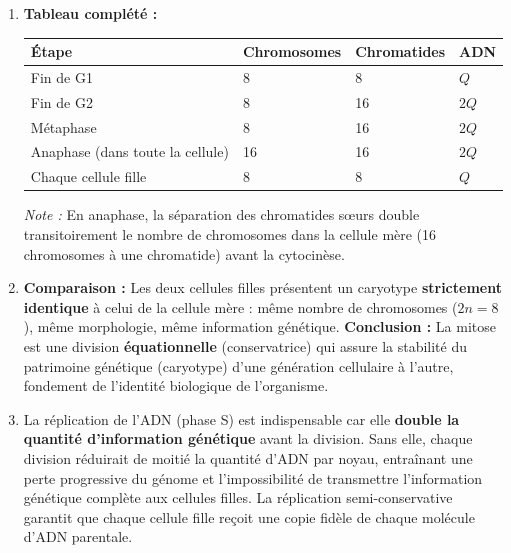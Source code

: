 \documentclass[11pt]{article}
\begin{document}
\begin{corrige}[Exercice 7 — Une cellule à $2n = 8$ chromosomes]
\begin{enumerate}
\item \textbf{Tableau complété :}
\begin{center}
\begin{tabularx}{\linewidth}{|l|X|X|X|}
\hline
\rowcolor{popblueL} \textbf{Étape} & \textbf{Chromosomes} & \textbf{Chromatides} & \textbf{ADN} \\
\hline
Fin de G1 & 8 & 8 & $Q$ \\
\hline
Fin de G2 & 8 & 16 & $2Q$ \\
\hline
Métaphase & 8 & 16 & $2Q$ \\
\hline
Anaphase (dans toute la cellule) & 16 & 16 & $2Q$ \\
\hline
Chaque cellule fille & 8 & 8 & $Q$ \\
\hline
\end{tabularx}
\end{center}
\textit{Note :} En anaphase, la séparation des chromatides sœurs double transitoirement le nombre de chromosomes dans la cellule mère (16 chromosomes à une chromatide) avant la cytocinèse.

\item \textbf{Comparaison :} Les deux cellules filles présentent un caryotype \textbf{strictement identique} à celui de la cellule mère : même nombre de chromosomes ($2n=8$), même morphologie, même information génétique.
\textbf{Conclusion :} La mitose est une division \textbf{équationnelle} (conservatrice) qui assure la stabilité du patrimoine génétique (caryotype) d'une génération cellulaire à l'autre, fondement de l'identité biologique de l'organisme.

\item La réplication de l'ADN (phase S) est indispensable car elle \textbf{double la quantité d'information génétique} avant la division. Sans elle, chaque division réduirait de moitié la quantité d'ADN par noyau, entraînant une perte progressive du génome et l'impossibilité de transmettre l'information génétique complète aux cellules filles. La réplication semi-conservative garantit que chaque cellule fille reçoit une copie fidèle de chaque molécule d'ADN parentale.
\end{enumerate}
\end{corrige}
\end{document}
